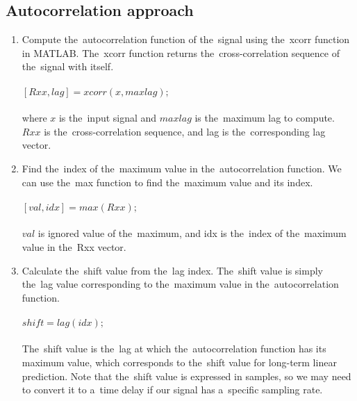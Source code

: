         \subsection{Autocorrelation approach} \label{subsec:acorr}
        \begin{enumerate}
            \item Compute the~autocorrelation function of the~signal using the~xcorr function in MATLAB.
           The~xcorr function returns the~cross-correlation sequence of the~signal with itself.\\
            \\
            $[Rxx, lag] = xcorr(x, maxlag);$\\
            \\
            where $x$ is the~input signal and $maxlag$ is the~maximum lag to compute. $Rxx$ is the~cross-correlation
            sequence, and lag is the~corresponding lag vector.
            \item Find the~index of the~maximum value in the~autocorrelation function. We can use the~max function to
            find the~maximum value and its index.\\
            \\
            $[val, idx] = max(Rxx);$\\
            \\
            $val$ is ignored value of the~maximum, and idx is the~index of the~maximum value in the~Rxx vector.
            \item Calculate the~shift value from the~lag index. The~shift value is simply the~lag value
            corresponding to the~maximum value in the~autocorrelation function.\\
            \\
            $shift = lag(idx);$\\
            \\
           The~shift value is the~lag at which the~autocorrelation function has its maximum value, which
            corresponds to the~shift value for long-term linear prediction. Note that the~shift value is expressed in
            samples, so we may need to convert it to a~time delay if our signal has a~specific sampling rate.
        \end{enumerate}
